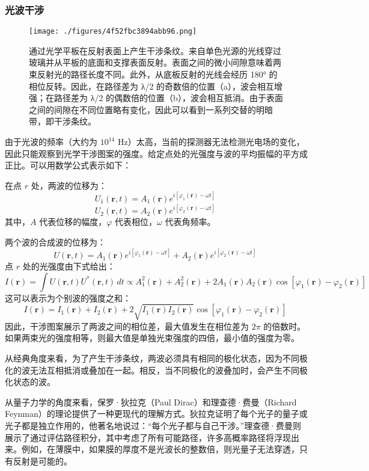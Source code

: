 \subsubsection{光波干涉}
\begin{figure}[ht]
\centering
\texttt{[image: ./figures/4f52fbc3894abb96.png]}
\caption{通过光学平板在反射表面上产生干涉条纹。来自单色光源的光线穿过玻璃并从平板的底面和支撑表面反射。表面之间的微小间隙意味着两束反射光的路径长度不同。此外，从底板反射的光线会经历 180° 的相位反转。因此，在路径差为 λ/2 的奇数倍的位置（a），波会相互增强；在路径差为 λ/2 的偶数倍的位置（b），波会相互抵消。由于表面之间的间隙在不同位置略有变化，因此可以看到一系列交替的明暗带，即干涉条纹。} \label{fig_GSWLX_9}
\end{figure}
由于光波的频率（大约为 \(10^{14}\) Hz）太高，当前的探测器无法检测光电场的变化，因此只能观察到光学干涉图案的强度。给定点处的光强度与波的平均振幅的平方成正比。可以用数学公式表示如下：

在点 \(r\) 处，两波的位移为：
\[
U_1(\mathbf{r}, t) = A_1(\mathbf{r}) e^{i[\varphi_1(\mathbf{r}) - \omega t]}~
\]
\[
U_2(\mathbf{r}, t) = A_2(\mathbf{r}) e^{i[\varphi_2(\mathbf{r}) - \omega t]}~
\]
其中，\(A\) 代表位移的幅度，\(\varphi\) 代表相位，\(\omega\) 代表角频率。

两个波的合成波的位移为：
\[
U(\mathbf{r}, t) = A_1(\mathbf{r}) e^{i[\varphi_1(\mathbf{r}) - \omega t]} + A_2(\mathbf{r}) e^{i[\varphi_2(\mathbf{r}) - \omega t]}~
\]
点 \(r\) 处的光强度由下式给出：
\[
I(\mathbf{r}) = \int U(\mathbf{r}, t) U^*(\mathbf{r}, t)\, dt \propto A_1^2(\mathbf{r}) + A_2^2(\mathbf{r}) + 2A_1(\mathbf{r}) A_2(\mathbf{r}) \cos[\varphi_1(\mathbf{r}) - \varphi_2(\mathbf{r})]~
\]
这可以表示为个别波的强度之和：
\[
I(\mathbf{r}) = I_1(\mathbf{r}) + I_2(\mathbf{r}) + 2 \sqrt{I_1(\mathbf{r}) I_2(\mathbf{r})} \cos[\varphi_1(\mathbf{r}) - \varphi_2(\mathbf{r})]~
\]
因此，干涉图案展示了两波之间的相位差，最大值发生在相位差为 \(2\pi\) 的倍数时。如果两束光的强度相等，则最大值是单独光束强度的四倍，最小值的强度为零。

从经典角度来看，为了产生干涉条纹，两波必须具有相同的极化状态，因为不同极化的波无法互相抵消或叠加在一起。相反，当不同极化的波叠加时，会产生不同极化状态的波。

从量子力学的角度来看，保罗·狄拉克（Paul Dirac）和理查德·费曼（Richard Feynman）的理论提供了一种更现代的理解方式。狄拉克证明了每个光子的量子或光子都是独立作用的，他著名地说过：“每个光子都与自己干涉。”理查德·费曼则展示了通过评估路径积分，其中考虑了所有可能路径，许多高概率路径将浮现出来。例如，在薄膜中，如果膜的厚度不是光波长的整数倍，则光量子无法穿透，只有反射是可能的。

